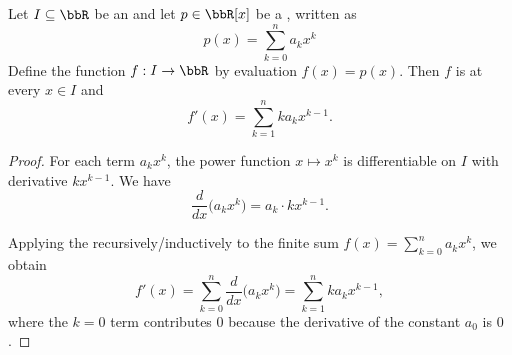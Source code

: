 \begin{corollary} \label{corollary:derivative_of_a_real_polynomial_function_on_real_interval}
    Let $I \subseteq \bbR$ be an  and let $p \in \bbR[x]$ be a , written as
    $$p(x) = \sum_{k=0}^{n} a_k x^k$$ Define the function $f : I \to \bbR$ by evaluation $f(x) = p(x)$. Then $f$ is  at every $x \in I$ and
    $$f'(x) = \sum_{k=1}^{n} k a_k x^{k-1}.$$
\end{corollary}
\begin{proof}
    For each term $a_k x^k$, the power function $x \mapsto x^k$ is differentiable on $I$ with derivative $k x^{k-1}$. We have 
    $$\frac{d}{dx}\bigl(a_k x^k\bigr) = a_k \cdot k x^{k-1}.$$

    Applying the  recursively/inductively to the finite sum $f(x) = \sum_{k=0}^n a_k x^k$, we obtain
    $$f'(x) = \sum_{k=0}^n \frac{d}{dx}\bigl(a_k x^k\bigr) = \sum_{k=1}^n k a_k x^{k-1},$$
    where the $k=0$ term contributes $0$ because the derivative of the constant $a_0$ is $0$.
\end{proof}